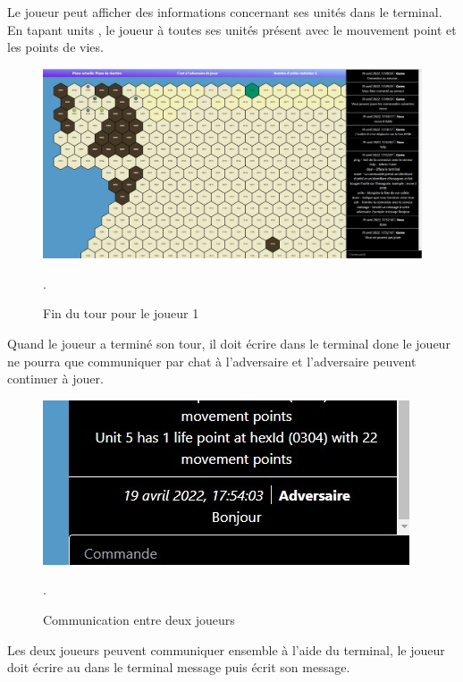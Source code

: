 Le joueur peut afficher des informations concernant ses unités dans le terminal.
En tapant \og units \fg{}, le joueur à toutes ses unités présent avec le mouvement point et  les points de vies.

\begin{figure}[H]
\centering
\includegraphics[scale=0.35]{data/fin tour.jpg}
\caption{Fin du tour pour le joueur 1}.
\end{figure}

Quand le joueur a terminé son tour, il doit écrire dans le terminal \og done \fg{}
le joueur ne pourra que communiquer par chat à l'adversaire et l'adversaire peuvent continuer à jouer.\\

\begin{figure}[H]
\centering
\includegraphics[scale=0.6]{data/chat .jpg}
\caption{Communication entre deux joueurs}.
\end{figure}
Les deux joueurs peuvent communiquer ensemble  à l'aide du terminal, le joueur doit écrire au dans le terminal \og message \fg{} puis écrit son message.


